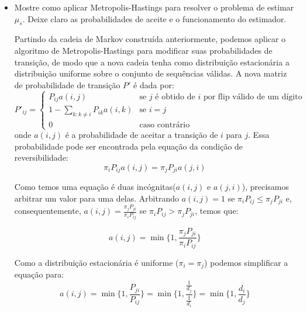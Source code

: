 \begin{itemize}
\begin{resposta}
\begin{center}
    \end{center}
  \end{resposta}
  \item Mostre como aplicar Metropolis-Hastings para resolver o problema de estimar $\mu_s$. Deixe claro as probabilidades de aceite e o funcionamento do estimador.
  \begin{resposta}
   Partindo da cadeia de Markov construída anteriormente, podemos aplicar o algoritmo de Metropolis-Hastings para modificar suas probabilidades de transição, de modo que a nova cadeia tenha como distribuição estacionária a distribuição uniforme sobre o conjunto de sequências válidas.
    A nova matriz de probabilidade de transição $P'$ é dada por:
     $$ P'_{ij} = \begin{cases}
      P_{ij}a(i,j) & \text{se } j \text{ é obtido de } i \text{ por flip válido de um dígito} \\
      1-\sum_{k:k \neq i}P_{ik}a(i,k) & \text{se } i=j \\
      0 & \text{caso contrário}
    \end{cases} $$
    onde $a(i,j)$ é a probabilidade de aceitar a transição de $i$ para $j$. Essa probabilidade pode ser encontrada pela equação da condição de reversibilidade:
    $$ \pi_iP_{ij}a(i,j) = \pi_jP_{ji}a(j,i) $$
    
    Como temos uma equação é duas incógnitas($a(i,j)$ e $a(j,i)$), precisamos arbitrar um valor para uma delas. Arbitrando $a(i,j) = 1$ se $\pi_i P_{ij} \leq \pi_j P_{ji}$ e, consequentemente, $a(i,j) = \frac{\pi_j P_{ji}}{\pi_i P_{ij}}$ se $\pi_i P_{ij} > \pi_j P_{ji}$, temos que:

    $$ a(i,j) =  \min\{1, \frac{\pi_j P_{ji}}{\pi_i P_{ij}}\} $$

    Como a distribuição estacionária é uniforme ($\pi_i = \pi_j$) podemos simplificar a equação para:
    $$ a(i,j) =  \min\{1, \frac{P_{ji}}{P_{ij}}\} = \min\{1, \frac{\frac{1}{d_j}}{\frac{1}{d_i}}\} = \min\{1, \frac{d_i}{d_j}\} $$


\end{resposta}
\end{itemize}
